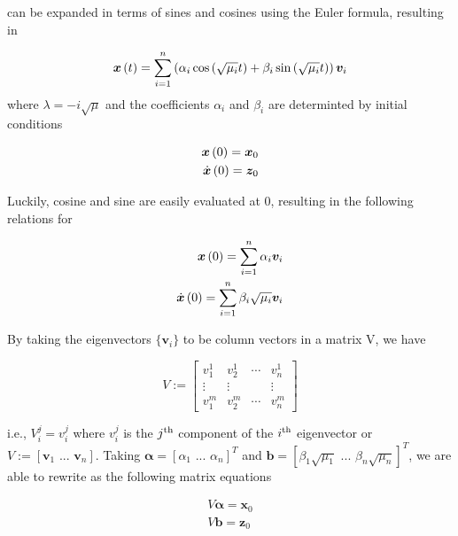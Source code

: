 \documentclass[10pt,a4paper]{article}
\renewcommand{\vec}[1]{\boldsymbol{#1}}
\begin{document}
\begin{multicols*}{2}
 can be expanded in terms of sines and cosines using the Euler formula, resulting in

\begin{equation}
	\vec{x}\paren{t} = \sum\limits_{i=1}^n \paren{\alpha_i \cos{\paren{\sqrt{\mu_i} t}} + \beta_i \sin{\paren{\sqrt{\mu_i} t}}} \vec{v}_i
\end{equation}
where $\lambda = -i\sqrt{\mu}$ and the coefficients $\alpha_i$ and $\beta_i$ are determinted by initial conditions

\begin{subequations}
	\begin{align}
		\vec{x} \paren{0} = \vec{x}_0 \label{eqn: xic} \\
		\dot{\vec{x}} \paren{0} = \vec{z}_0 \label{eqn: derivative ic}
	\end{align}
\end{subequations}

Luckily, cosine and sine are easily evaluated at 0, resulting in the following relations for 

\begin{subequations}
	\begin{align}
		\vec{x}\paren{0} = \sum\limits_{i=1}^n \alpha_i \vec{v}_i \label{eqn: alphaeq} \\
		\dot{\vec{x}}\paren{0} = \sum\limits_{i=1}^n \beta_i \sqrt{\mu_i} \vec{v}_i \label{eqn: betaeq}
	\end{align}
\end{subequations}

By taking the eigenvectors $\{ \vec{v}_i\}$ to be column vectors in a matrix V, we have

$$
V := 
\begin{bmatrix}
	v_1^1 & v_2^1 & \cdots & v_n^1 \\
	\vdots & \vdots & & \vdots \\
	v_1^m & v_2^m & \cdots & v_n^m
\end{bmatrix}
$$

	i.e., $V_i^j = v_i^j$ where $v_i^j$ is the $j^{\rm{th}}$ component of the $i^{\rm{th}}$ eigenvector or $V := [ \vec{v}_1 \,\,...\,\, \vec{v}_n ]$. Taking $\vec{\alpha} = \left[ \alpha_1 \,\,...\,\, \alpha_n \right]^T$ and $\vec{b} = \left[ \beta_1 \sqrt{\mu_1} \,\,...\,\, \beta_n \sqrt{\mu_n} \right]^T$, we are able to rewrite  as the following matrix equations

\begin{subequations}
	\begin{align}
		V \vec{\alpha} = \vec{x}_0 \label{eqn: amat} \\
		V \vec{b} = \vec{z}_0 \label{eqn: bmat}
	\end{align}
\end{subequations}


\end{multicols*}
\end{document}
